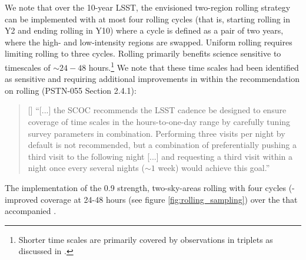We note that over the 10-year LSST, the envisioned two-region rolling strategy can be implemented with at most four rolling cycles (that is, starting rolling in Y2 and ending rolling in Y10) where a cycle is defined as a pair of two years, where the high- and low-intensity regions are swapped. Uniform rolling requires limiting rolling to three cycles. Rolling primarily benefits science sensitive to timescales of $\sim24-48$ hours.\footnote{Shorter time scales are primarily covered by observations in triplets as discussed in .} 
We note that these time scales had been identified as sensitive and requiring additional improvements in  within the recommendation on rolling (PSTN-055 Section 2.4.1): 

\begin{quote}
[] ``[...] the SCOC recommends the LSST cadence
be designed to ensure coverage of time scales in the hours-to-one-day range by carefully tuning survey parameters in combination. Performing three visits per night by default is not recommended, but a combination of preferentially pushing a third visit to the following night [...] and requesting a third visit within a night once every several nights ($\sim 1$ week) would achieve this goal.'' 
\end{quote}

The implementation of the 0.9 strength, two-sky-areas rolling with four cycles (- improved coverage at 24-48 hours (see figure \autoref{fig:rolling_sampling}) over the  that accompanied .


